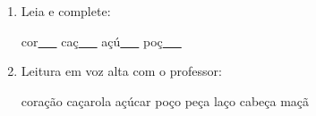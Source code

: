 \begin{exercicio}
\begin{enumerate}[resume]
\begin{enumerate}[label=(\alph*)]
    \item O som da unidade é: ( ) oral ( ) nasal 

    \item A primeira sílaba de CORAÇÃO é: ( ) ÇA ( ) ÇO

    \item As palavras da unidade aparecem: ( ) no início ( ) no meio ( ) no fim das palavras

  \end{enumerate}

  \item Leia e complete:
  \begin{center}
  cor\underline{~~~} \quad caç\underline{~~~} \quad açú\underline{~~~} \quad poç\underline{~~~}
  \end{center}

  \item Leitura em voz alta com o professor:
  \begin{center}
  coração \quad caçarola \quad açúcar \quad poço \quad peça \quad laço \quad cabeça \quad maçã
  \end{center}

\end{enumerate}

\end{exercicio}



